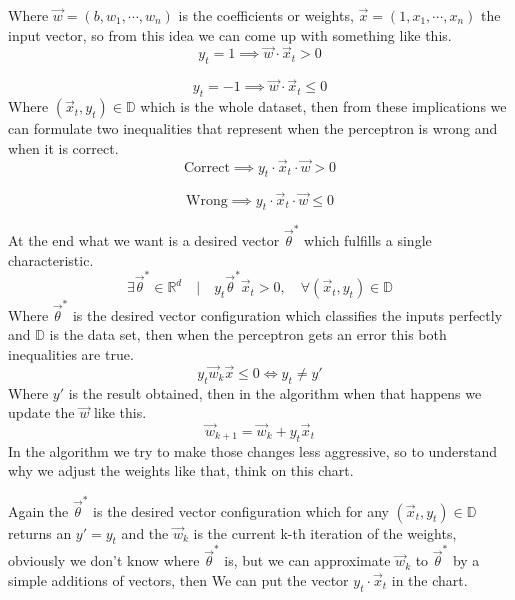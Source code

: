 Where $\vec{w} = (b, w_1, \cdots, w_n)$
is the coefficients or weights, $\vec{x} = (1, x_1, \cdots, x_n)$
the input vector, so from this idea we can come up
with something like this.
\[
  y_t = 1 \implies \vec{w} \cdot \vec{x}_t > 0
\]

\[
  y_t =  - 1 \implies \vec{w} \cdot \vec{x}_t \le 0
\]
Where $(\vec{x}_t, y_t) \in \mathbb{D}$ which is the whole dataset, then from these implications
we can formulate two inequalities that
represent when the perceptron is wrong and when it is correct.
\[
  \text{Correct} \implies y_t \cdot \vec{x}_t \cdot \vec{w} > 0
\]

\[
  \text{Wrong} \implies y_t \cdot \vec{x}_t \cdot \vec{w} \le 0
\]

At the end what we want is a desired vector $\vec{\theta}^*$ which fulfills a single characteristic.
\[
  \exists \vec{\theta}^* \in \mathbb{R}^{d} \quad|\quad y_t\vec{\theta}^*\vec{x}_t > 0,\quad
  \forall (\vec{x}_t, y_t) \in \mathbb{D}
\]
Where $\vec{\theta}^*$ is the desired vector configuration which classifies the inputs perfectly
and $\mathbb{D}$ is the data set,
then when the perceptron gets an error this both inequalities are true.
\[
  y_t\vec{w}_k \vec{x} \le 0 \Leftrightarrow  y_t \not = y'
\]
Where $y'$ is the result obtained,
then in the algorithm when that happens we update the $\vec{w}$ like this.
\[
  \vec{w}_{k + 1} = \vec{w}_{k} + y_t\vec{x}_t
\]
In the algorithm we try to make those changes less aggressive, so to understand
why we adjust the weights like that, think on this chart.
\begin{center}
\end{center}
Again the $\vec{\theta}^*$ is the desired vector configuration which for any
$(\vec{x}_t, y_t) \in \mathbb{D}$ returns an $y' = y_t$ and the $\vec{w}_k$ is the current k-th iteration
of the weights, obviously we don't know where $\vec{\theta}^*$ is, but we can approximate $\vec{w}_k$
to $\vec{\theta}^*$ by a 
simple additions of vectors,
then We can put the vector $y_t \cdot \vec{x}_t$ in the chart.
\begin{center}
\end{center}
